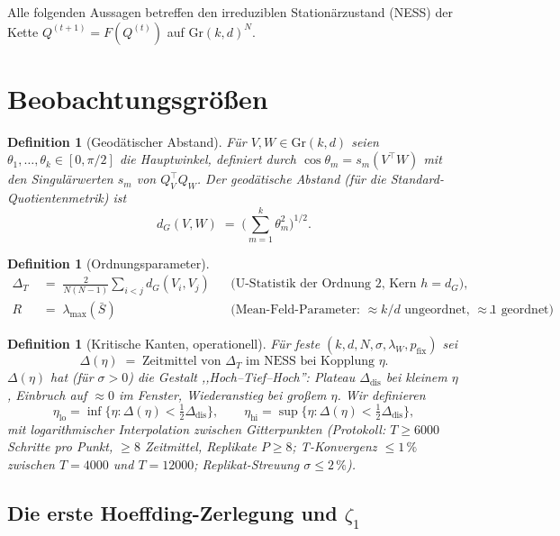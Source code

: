 \documentclass[11pt,a4paper]{article}
\newtheorem{definition}[satz]{Definition}
\theoremstyle{remark}
\newcommand{\Gr}{\mathrm{Gr}}
\begin{document}
Alle folgenden Aussagen betreffen den irreduziblen Stationärzustand
(NESS) der Kette $Q^{(t+1)}=F(Q^{(t)})$ auf $\Gr(k,d)^N$.

\section{Beobachtungsgrößen}

\begin{definition}[Geodätischer Abstand]\label{def:geo}
Für $V,W\in\Gr(k,d)$ seien $\theta_1,\dots,\theta_k\in[0,\pi/2]$ die
Hauptwinkel, definiert durch
$\cos\theta_m = s_m(V^{\top}W)$ mit den Singulärwerten
$s_m$ von $Q_V^\top Q_W$. Der geodätische Abstand (für die Standard-
Quotientenmetrik) ist
\[
d_G(V,W)\;=\;\Big(\sum_{m=1}^k \theta_m^2\Big)^{1/2}.
\]
\end{definition}

\begin{definition}[Ordnungsparameter]
\begin{align}
\Delta_T &\;=\;\frac{2}{N(N-1)}\sum_{i<j} d_G(V_i,V_j)
&&\text{(U-Statistik der Ordnung 2, Kern $h=d_G$)},\\
R &\;=\;\lambda_{\max}(\bar S)
&&\text{(Mean-Feld-Parameter: $\approx k/d$ ungeordnet, $\approx1$ geordnet)}.
\end{align}
\end{definition}

\begin{definition}[Kritische Kanten, operationell]
Für feste $(k,d,N,\sigma,\lambda_W,p_{\mathrm{fix}})$ sei
\[
\Delta(\eta)\;=\;\text{Zeitmittel von $\Delta_T$ im NESS bei Kopplung }\eta .
\]
$\Delta(\eta)$ hat (für $\sigma>0$) die Gestalt
,,Hoch--Tief--Hoch'': Plateau $\Delta_{\mathrm{dis}}$ bei kleinem $\eta$,
Einbruch auf $\approx0$ im Fenster, Wiederanstieg bei großem $\eta$.
Wir definieren
\[
\eta_{\mathrm{lo}}=\inf\{\eta:\Delta(\eta)<\tfrac12\Delta_{\mathrm{dis}}\},
\qquad
\eta_{\mathrm{hi}}=\sup\{\eta:\Delta(\eta)<\tfrac12\Delta_{\mathrm{dis}}\},
\]
mit logarithmischer Interpolation zwischen Gitterpunkten
(Protokoll: $T\ge6000$ Schritte pro Punkt, $\ge8$ Zeitmittel,
Replikate $P\ge8$; T-Konvergenz $\le1\,\%$ zwischen $T=4000$ und
$T=12000$; Replikat-Streuung $\sigma\le2\,\%$).
\end{definition}

\subsection{Die erste Hoeffding-Zerlegung und $\zeta_1$}
\end{document}
